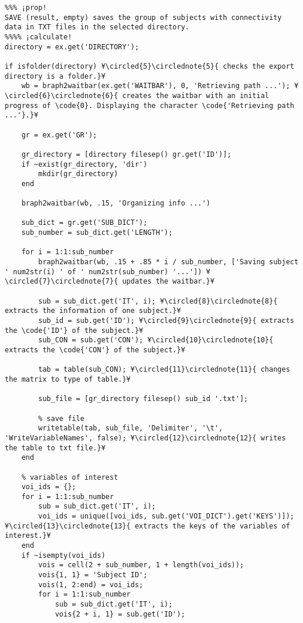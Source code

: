 \documentclass{tufte-handout}
\begin{document}
\begin{lstlisting}
%%% ¡prop!
SAVE (result, empty) saves the group of subjects with connectivity data in TXT files in the selected directory.
%%%% ¡calculate!
directory = ex.get('DIRECTORY');

if isfolder(directory) ¥\circled{5}\circlednote{5}{ checks the export directory is a folder.}¥
    wb = braph2waitbar(ex.get('WAITBAR'), 0, 'Retrieving path ...'); ¥\circled{6}\circlednote{6}{ creates the waitbar with an initial progress of \code{0}. Displaying the character \code{'Retrieving path ...'}.}¥
    
    gr = ex.get('GR');

    gr_directory = [directory filesep() gr.get('ID')];
    if ~exist(gr_directory, 'dir')
        mkdir(gr_directory)
    end
    
    braph2waitbar(wb, .15, 'Organizing info ...')
    
    sub_dict = gr.get('SUB_DICT');
    sub_number = sub_dict.get('LENGTH');
    
    for i = 1:1:sub_number
        braph2waitbar(wb, .15 + .85 * i / sub_number, ['Saving subject ' num2str(i) ' of ' num2str(sub_number) '...']) ¥\circled{7}\circlednote{7}{ updates the waitbar.}¥
        
        sub = sub_dict.get('IT', i); ¥\circled{8}\circlednote{8}{ extracts the information of one subject.}¥
        sub_id = sub.get('ID'); ¥\circled{9}\circlednote{9}{ extracts the \code{'ID'} of the subject.}¥
        sub_CON = sub.get('CON'); ¥\circled{10}\circlednote{10}{ extracts the \code{'CON'} of the subject.}¥

        tab = table(sub_CON); ¥\circled{11}\circlednote{11}{ changes the matrix to type of table.}¥

        sub_file = [gr_directory filesep() sub_id '.txt'];

        % save file
        writetable(tab, sub_file, 'Delimiter', '\t', 'WriteVariableNames', false); ¥\circled{12}\circlednote{12}{ writes the table to txt file.}¥
    end
    
    % variables of interest
    voi_ids = {};
    for i = 1:1:sub_number
        sub = sub_dict.get('IT', i);
        voi_ids = unique([voi_ids, sub.get('VOI_DICT').get('KEYS')]); ¥\circled{13}\circlednote{13}{ extracts the keys of the variables of interest.}¥
    end
    if ~isempty(voi_ids)
        vois = cell(2 + sub_number, 1 + length(voi_ids));
        vois{1, 1} = 'Subject ID';
        vois(1, 2:end) = voi_ids;
        for i = 1:1:sub_number
            sub = sub_dict.get('IT', i);
            vois{2 + i, 1} = sub.get('ID');
            

\end{lstlisting}
\end{document}
